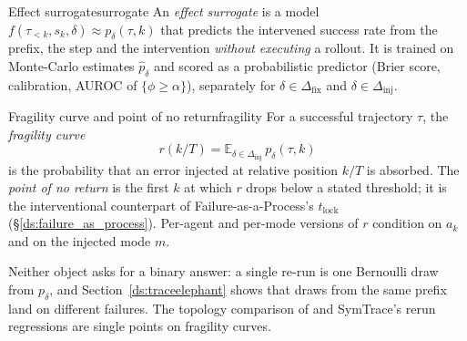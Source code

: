 \documentclass[10pt,a4paper]{article}
\begin{document}
\begin{definition}{Effect surrogate}{surrogate}
An \emph{effect surrogate} is a model $f(\tau_{<k},s_k,\delta)\approx p_\delta(\tau,k)$ that predicts the intervened success rate from the prefix, the step and the intervention \emph{without executing} a rollout. It is trained on Monte-Carlo estimates $\hat p_\delta$ and scored as a probabilistic predictor (Brier score, calibration, AUROC of $\{\phi\ge\alpha\}$), separately for $\delta\in\Delta_{\mathrm{fix}}$ and $\delta\in\Delta_{\mathrm{inj}}$.
\end{definition}

\begin{definition}{Fragility curve and point of no return}{fragility}
For a successful trajectory $\tau$, the \emph{fragility curve}
\[r(k/T)=\mathbb{E}_{\delta\in\Delta_{\mathrm{inj}}}\,p_\delta(\tau,k)\]
is the probability that an error injected at relative position $k/T$ is absorbed. The \emph{point of no return} is the first $k$ at which $r$ drops below a stated threshold; it is the interventional counterpart of Failure-as-a-Process's $t_{\mathrm{lock}}$ (\S\ref{ds:failure_as_process}). Per-agent and per-mode versions of $r$ condition on $a_k$ and on the injected mode $m$.
\end{definition}

Neither object asks for a binary answer: a single re-run is one Bernoulli draw from $p_\delta$, and Section~\ref{ds:traceelephant} shows that draws from the same prefix land on different failures. The topology comparison of \citet{huang2024resilience} and SymTrace's rerun regressions \cite{luan2026symtrace} are single points on fragility curves.
\end{document}
